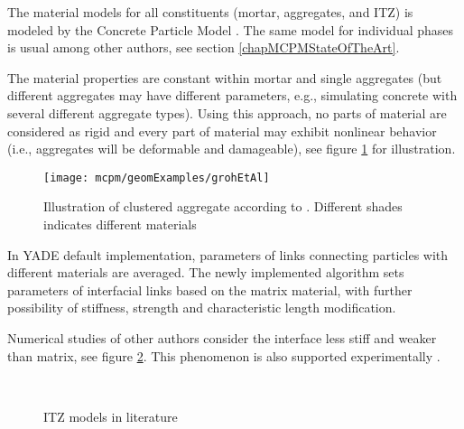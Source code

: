 The material models for all constituents (mortar, aggregates, and ITZ) is modeled by the Concrete Particle Model \cite{Smilauer2010a}.
The same model for individual phases is usual among other authors, see section \ref{chapMCPMStateOfTheArt}.

The material properties are constant within mortar and single aggregates (but different aggregates may have different parameters, e.g., simulating concrete with several different aggregate types).
Using this approach, no parts of material are considered as rigid and every part of material may exhibit nonlinear behavior (i.e., aggregates will be deformable and damageable), see figure \ref{figMCPMClusteredAggregateIllustration} for illustration.
\begin{figure}[ht]
	\centering
	\texttt{[image: mcpm/geomExamples/grohEtAl]}
	\caption[Illustration of clustered aggregate]{Illustration of clustered aggregate according to \cite{GrohKonietzkyWalterHerbst2011a}. Different shades indicates different materials}
	\label{figMCPMClusteredAggregateIllustration}
\end{figure}

In YADE default implementation, parameters of links connecting particles with different materials are averaged.
The newly implemented algorithm sets parameters of interfacial links based on the matrix material, with further possibility of stiffness, strength and characteristic length modification.

Numerical studies of other authors \cite{AzevedoLemosAlmeida2008a,KimAlrub2011a,Kozicki2007a,KwanWangChan1999b,GrasslRempling2008a,GuHongWangLin2013a,GrasslJirasek2010a,PradoMier2003a,QinZhang2011a,SnozziGatuingtMolinari2012a,TangZhangShi2008,TreggerCorrGrahambradyShah2006a,YipLiLiaoBolander2006a} consider the interface less stiff and weaker than matrix, see figure \ref{figMCPMITZModelInLiterature}.
This phenomenon is also supported experimentally \cite{TangZhangShi2008}.

\begin{figure}[htbp]
	\centering
	\\
	\caption[ITZ models in literature]{ITZ models in literature \cite{AzevedoLemosAlmeida2008a,KimAlrub2011a,Kozicki2007a,KwanWangChan1999b,GrasslRempling2008a,GuHongWangLin2013a,GrasslJirasek2010a,PradoMier2003a,QinZhang2011a,SnozziGatuingtMolinari2012a,TangZhangShi2008,TreggerCorrGrahambradyShah2006a,YipLiLiaoBolander2006a}}
	\label{figMCPMITZModelInLiterature}
\end{figure}


